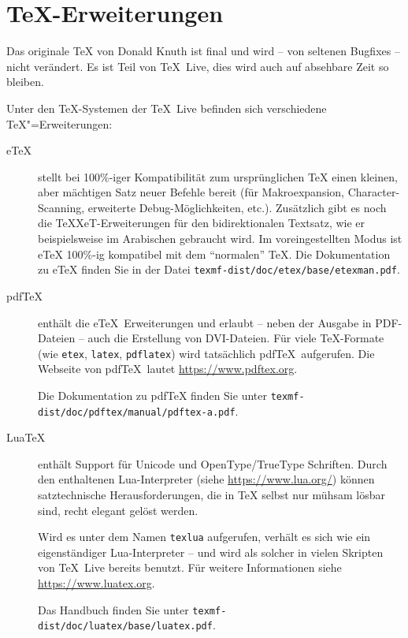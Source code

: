 \documentclass[12pt,ngerman,a4paper,fullparskip]{scrreprt}
\newcommand{\TL}{\TeX\ Live\xspace}
\newcommand{\prog}[1]{\texttt{#1}}
\newcommand{\OnCD}[1]{\texttt{#1}}
\newcommand{\filename}[1]{\texttt{#1}}
\newcommand{\TeXXeT}{TeXXeT}
\providecommand*{\eTeX}{e\TeX\xspace}
\begin{document}
\section{\TeX-Erweiterungen}\label{sec:tex-extensions}

Das originale \TeX{} von Donald Knuth ist final und wird -- von seltenen Bugfixes -- nicht verändert. Es ist Teil von \TL{}, dies wird auch auf absehbare Zeit so bleiben.

Unter den \TeX-Systemen der {\TL} befinden sich verschiedene \TeX"=Erweiterungen:

\begin{description}
\item [\eTeX]\label{text:etex} stellt bei 100\%-iger Kompatibilität zum
      ursprünglichen {\TeX} einen kleinen, aber mächtigen Satz neuer Befehle
      bereit (für Makroexpansion, Character-Scanning, erweiterte Debug-Möglichkeiten, etc.).
      Zusätzlich gibt es noch die \TeXXeT-Erweiterungen für den bidirektionalen Textsatz, 
      wie er beispielsweise im Arabischen gebraucht wird.
      Im voreingestellten Modus ist {\eTeX} 100\%-ig kompatibel mit dem \enquote{normalen} \TeX.
      Die Dokumentation zu {\eTeX} finden Sie in der Datei
      \OnCD{texmf-dist/doc/etex/base/etex\textunderscore man.pdf}.
\item [pdf\TeX] enthält die \eTeX\ Erweiterungen und erlaubt -- neben der Ausgabe in PDF-Dateien -- auch die Erstellung von DVI-Dateien.  Für viele \TeX-Formate (wie \prog{etex}, \prog{latex}, \prog{pdflatex}) wird tatsächlich pdf\TeX\ aufgerufen. Die Webseite von pdf\TeX\ lautet \url{https://www.pdftex.org}.
      
Die Dokumentation zu pdf\TeX{} finden Sie unter  \newline \OnCD{texmf-dist/doc/pdftex/manual/pdftex-a.pdf}. 

\item [Lua\TeX] enthält Support für Unicode und OpenType/TrueType Schriften. Durch den enthaltenen Lua-Interpreter (siehe \url{https://www.lua.org/}) können satztechnische Herausforderungen, die in \TeX{} selbst nur mühsam lösbar sind, recht elegant gelöst werden.

Wird es unter dem Namen \filename{texlua} aufgerufen, verhält es sich wie ein eigenständiger Lua-Interpreter -- und wird als solcher in vielen Skripten von \TL bereits benutzt. Für weitere Informationen siehe \url{https://www.luatex.org}.

Das Handbuch finden Sie unter \OnCD{texmf-dist/doc/luatex/base/luatex.pdf}.


\end{description}
\end{document}
